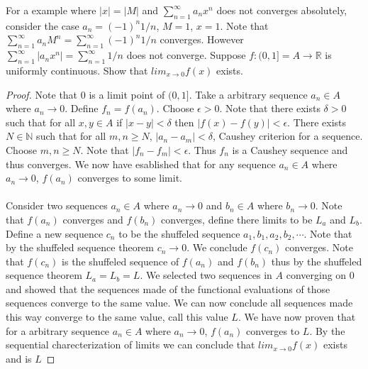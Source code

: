 \documentclass[12pt]{article}
\makeatletter
\theoremstyle{homework}
\newenvironment{exercise}[1]
{\def\@currentlabel{#1}\exercisecore}
{\endexercisecore}
\makeatother
\begin{document}
For a example where $|x| = |M|$ and $\sum^\infty_{n=1} a_nx^n$ does not converges absolutely, consider the case $a_n=(-1)^n1/n$, $M=1$, $x=1$.  Note that $\sum^\infty_{n=1} a_nM^n=\sum^\infty_{n=1} (-1)^n1/n$ converges.  However $\sum^\infty_{n=1} |a_nx^n|=\sum^\infty_{n=1} 1/n$ does not converge.
\begin{exercise} 3
Suppose $f : (0,1]=A \rightarrow\mathbb{R}$ is uniformly continuous. Show that $lim_{x\rightarrow 0} f (x)$ exists.
\end{exercise}
\begin{proof}
Note that 0 is a limit point of $(0,1]$.  Take a arbitrary sequence $a_n\in A$ where $a_n\rightarrow 0$.  Define $f_n=f(a_n)$.  Choose $\epsilon>0$.  Note that there exists $\delta>0$ such that for all $x,y\in A$ if $|x-y|<\delta$ then $|f(x)-f(y)|<\epsilon$.  There exists $N\in \mathbb{N}$ such that for all $m, n\geq N$, $|a_n-a_m|<\delta$, Caushey criterion for a sequence.  Choose $m, n\geq N$.  Note that $|f_n-f_m|<\epsilon$.  Thus $f_n$ is a Caushey sequence and thus converges.  We now have esablished that for any sequence $a_n\in A$ where $a_n\rightarrow 0$, $f(a_n)$ converges to some limit.\\\\
Consider two sequences $a_n\in A$ where $a_n\rightarrow 0$ and $b_n\in A$ where $b_n\rightarrow 0$.  Note that $f(a_n)$ converges and $f(b_n)$ converges, define there limits to be $L_a$ and $L_b$.  Define a new sequence $c_n$ to be the shuffeled sequence $a_1,b_1,a_2,b_2,\cdots$.  Note that by the shuffeled sequence theorem $c_n\rightarrow 0$.  We conclude $f(c_n)$ converges.  Note that $f(c_n)$ is the shuffeled sequence of $f(a_n)$ and $f(b_n)$ thus by the shuffeled sequence theorem $L_a=L_b=L$.  We selected two sequences in $A$ converging on 0 and showed that the sequences made of the functional evaluations of those sequences converge to the same value.  We can now conclude all sequences made this way converge to the same value, call this value $L$.  We have now proven that for a arbitrary sequence $a_n\in A$ where $a_n\rightarrow 0$, $f(a_n)$ converges to $L$.  By the sequential charecterization of limits we can conclude that $lim_{x\rightarrow 0} f (x)$ exists and is $L$
\end{proof}
\end{document}
